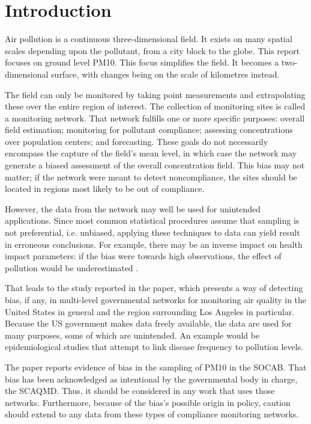\section{Introduction}\label{sec:introduction}

Air pollution is a continuous three-dimensional field.  It exists on many spatial scales depending upon the pollutant, from a city block to the globe.  This report focuses on ground level PM10.  This focus simplifies the field. It becomes a two-dimensional surface, with changes being on the scale of kilometres \citep{CFR:Title40-58} instead.   

The field can only be monitored by taking point measurements and extrapolating these over the entire region of interest. The collection of monitoring sites is called a monitoring network.  That network fulfills one or more specific purposes: overall field estimation; monitoring for pollutant compliance; assessing concentrations over population centers; and forecasting.  These goals do not necessarily encompass the capture of the field's mean level, in which case the network may generate a biased assessment of the overall concentration field. This bias may not matter; if the network were meant to detect noncompliance, the sites should be located in regions most likely to be out of compliance. 

However, the data from the network may well be used for unintended applications. Since most common statistical procedures assume that sampling is not preferential, i.e. unbiased, 
applying these techniques to data can yield result in erroneous conclusions.  For example, there may 
be an inverse impact on health impact parameters: if the bias were towards high observations, the effect of pollution would be underestimated \citep{Zidek:2012}.


That leads to the study reported in the paper, which presents a way of detecting bias, if any,
in multi-level governmental networks for monitoring air quality in the United States in general and the region surrounding Los Angeles in particular.  Because the US government makes data freely available, the data are used for many purposes, some of which are unintended. An example would be epidemiological studies that attempt to link disease frequency to pollution levels.

The paper reports evidence of bias in the sampling of PM10 in the SOCAB.  That bias has been acknowledged as intentional by the governmental body in charge, the SCAQMD.  Thus, it should be considered in any work that uses those networks. Furthermore, because of the bias's possible origin in policy, caution should extend to any data from these types of compliance monitoring networks.

